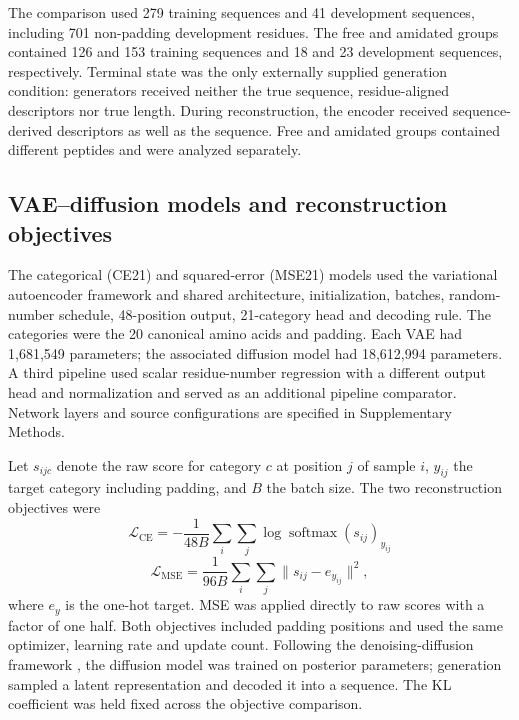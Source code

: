 \documentclass[unnumsec,webpdf,contemporary,large]{oup-authoring-template}
\begin{document}
The comparison used 279 training sequences and 41 development sequences, including 701 non-padding development residues. The free and amidated groups contained 126 and 153 training sequences and 18 and 23 development sequences, respectively. Terminal state was the only externally supplied generation condition: generators received neither the true sequence, residue-aligned descriptors nor true length. During reconstruction, the encoder received sequence-derived descriptors as well as the sequence. Free and amidated groups contained different peptides and were analyzed separately.

\subsection{VAE--diffusion models and reconstruction objectives}

The categorical (CE21) and squared-error (MSE21) models used the variational autoencoder framework \cite{refVAE} and shared architecture, initialization, batches, random-number schedule, 48-position output, 21-category head and decoding rule. The categories were the 20 canonical amino acids and padding. Each VAE had 1,681,549 parameters; the associated diffusion model had 18,612,994 parameters. A third pipeline used scalar residue-number regression with a different output head and normalization and served as an additional pipeline comparator. Network layers and source configurations are specified in Supplementary Methods.

Let $s_{ijc}$ denote the raw score for category $c$ at position $j$ of sample $i$, $y_{ij}$ the target category including padding, and $B$ the batch size. The two reconstruction objectives were
\begin{equation*}
\mathcal{L}_{\mathrm{CE}} = -\frac{1}{48B}\sum_{i}\sum_{j}\log \operatorname{softmax}(s_{ij})_{y_{ij}}
\end{equation*}
\begin{equation*}
\mathcal{L}_{\mathrm{MSE}} = \frac{1}{96B}\sum_{i}\sum_{j}\bigl\lVert s_{ij} - e_{y_{ij}} \bigr\rVert^{2},
\end{equation*}
where $e_y$ is the one-hot target. MSE was applied directly to raw scores with a factor of one half. Both objectives included padding positions and used the same optimizer, learning rate and update count. Following the denoising-diffusion framework \cite{refDDPM}, the diffusion model was trained on posterior parameters; generation sampled a latent representation and decoded it into a sequence. The KL coefficient was held fixed across the objective comparison.
\end{document}
